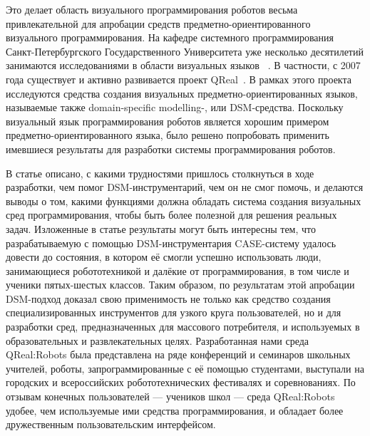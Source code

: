 \documentclass[a4paper]{article}
\begin{document}
Это делает область визуального программирования роботов весьма привлекательной для апробации средств предметно-ориентированного визуального программирования. На кафедре системного программирования Санкт-Петербургского Государственного Университета уже несколько десятилетий занимаются исследованиями в области визуальных языков ~\cite{videoDsl}\cite{dsmPlatforms}\cite{real1}\cite{real2}. В частности, с 2007 года существует и активно развивается проект QReal~\cite{qReal}. В рамках этого проекта исследуются средства создания визуальных предметно-ориентированных языков, называемые также domain-specific modelling-, или DSM-средства. Поскольку визуальный язык программирования роботов является хорошим примером предметно-ориентированного языка, было решено попробовать применить имевшиеся результаты для разработки системы программирования роботов. 

В статье описано, с какими трудностями пришлось столкнуться в ходе разработки, чем помог DSM-инструментарий, чем он не смог помочь, и делаются выводы о том, какими функциями должна обладать система создания визуальных сред программирования, чтобы быть более полезной для решения реальных задач. Изложенные в статье результаты могут быть интересны тем, что разрабатываемую с помощью DSM-инструментария CASE-систему удалось довести до состояния, в котором её смогли успешно использовать люди, занимающиеся робототехникой и далёкие от программирования, в том числе и ученики пятых-шестых классов. Таким образом, по результатам этой апробации DSM-подход доказал свою применимость не только как средство создания специализированных инструментов для узкого круга пользователей, но и для разработки сред, предназначенных для массового потребителя, и используемых в образовательных и развлекательных целях. Разработанная нами среда QReal:Robots была представлена на ряде конференций и семинаров школьных учителей, роботы, запрограммированные с её помощью студентами, выступали на городских и всероссийских робототехнических фестивалях и соревнованиях. По отзывам конечных пользователей --- учеников школ --- среда QReal:Robots удобее, чем используемые ими средства программирования, и обладает более дружественным пользовательским интерфейсом.
\end{document}
